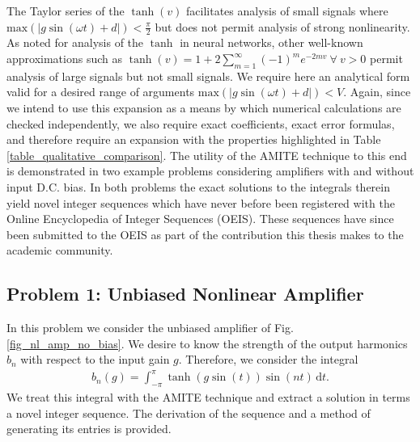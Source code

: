 The Taylor series of the $\tanh(v)$ facilitates analysis of small signals where $\mathrm{max}(|g\sin(\omega t) + d|) < \frac{\pi}{2}$ but does not permit analysis of strong nonlinearity.  As noted for analysis of the $\tanh$ in neural networks, other well-known approximations such as $\tanh(v) = 1 + 2 \sum_{m=1}^{\infty}(-1)^m e^{-2mv} \ \forall \  v > 0$ permit analysis of large signals but not small signals.  We require here an analytical form valid for a desired range of arguments $\mathrm{max}(|g\sin(\omega t) + d|) < V$.  Again, since we intend to use this expansion as a means by which numerical calculations are checked independently, we also require exact coefficients, exact error formulas, and therefore require an expansion with the properties highlighted in Table \ref{table_qualitative_comparison}.  The utility of the AMITE technique
to this end is demonstrated in two example problems considering amplifiers with and without input D.C. bias.  In both problems the exact solutions
to the integrals therein yield novel integer sequences
which have never before been registered with the Online Encyclopedia of Integer Sequences (OEIS).
These sequences have since been submitted to the OEIS as part of the contribution this thesis
makes to the academic community.

\subsection[Problem 1: Unbiased Nonlinear Amplifier]{Problem 1: Unbiased Nonlinear Amplifier}

In this problem we consider the unbiased amplifier of Fig. \ref{fig_nl_amp_no_bias}.
We desire to know the strength of the output harmonics $b_n$ with respect to the
input gain $g$.  Therefore, we consider the integral
\begin{align}
	b_n (g) = \int_{-\pi}^{\pi} \! \tanh(g \sin(t)) \sin(nt) \, \mathrm{d}t.
\end{align}
We treat this integral with the AMITE technique and extract a solution in terms a novel integer
sequence.  The derivation of the sequence and a method of generating its entries is
provided.


